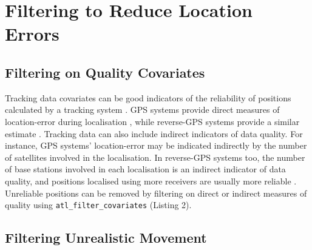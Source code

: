 \documentclass[10pt,paper=a4,headings=standardclasses
]{scrartcl}
\begin{document}
\section{Filtering to Reduce Location Errors}

\subsection{Filtering on Quality Covariates}

Tracking data covariates can be good indicators of the reliability of positions calculated by a tracking system \citep{beardsworth2021}.
GPS systems provide direct measures of location-error during localisation \citep[Horizontal Dilution of Precision, HDOP in GPS]{ranacher2016}, while  reverse-GPS systems provide a similar estimate \citep[called Standard Deviation, SD;][]{maccurdy2009, maccurdy2019, weiser2016, ranacher2016}.
Tracking data can also include indirect indicators of data quality.
For instance, GPS systems' location-error may be indicated indirectly by the number of satellites involved in the localisation.
In reverse-GPS systems too, the number of base stations involved in each localisation is an indirect indicator of data quality, and positions localised using more receivers are usually more reliable \citep[the minimum required for an ATLAS localisation is 3; see][]{weiser2016}.
Unreliable positions can be removed by filtering on direct or indirect measures of quality using \texttt{atl\_filter\_covariates} (Listing 2).

\subsection{Filtering Unrealistic Movement}
\end{document}
